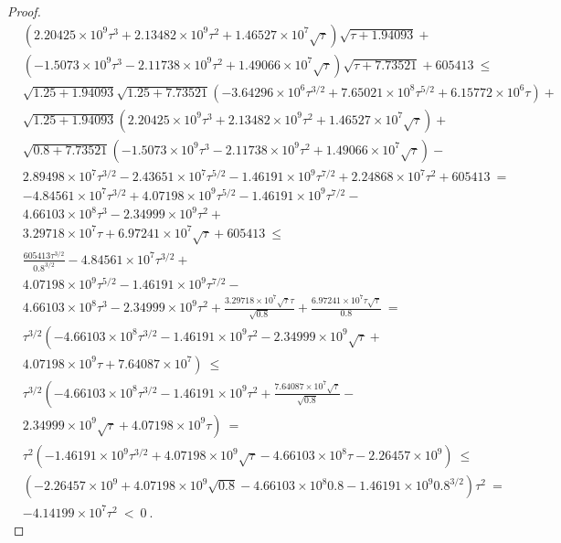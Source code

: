 \documentclass{article}
\renewcommand{\leq}{\leqslant}
\begin{document}
\begin{proof}
\begin{align}
&\left(2.20425\times 10^9 \tau^3+2.13482\times 10^9 \tau^2+1.46527\times 10^7 \sqrt{\tau}\right) \sqrt{\tau+1.94093}+\\ \nonumber 
&\left(-1.5073\times 10^9 \tau^3-2.11738\times 10^9 \tau^2+1.49066\times 10^7 \sqrt{\tau}\right) \sqrt{\tau+7.73521}+605413 \ \leq \\ \nonumber
&\sqrt{1.25 +1.94093} \sqrt{1.25 +7.73521} \left(-3.64296\times 10^6 \tau^{3/2}+7.65021\times 10^8 \tau^{5/2}+6.15772\times 10^6 \tau\right)+\\ \nonumber 
&\sqrt{1.25 +1.94093} \left(2.20425\times 10^9 \tau^3+2.13482\times 10^9 \tau^2+1.46527\times 10^7 \sqrt{\tau}\right)+\\ \nonumber 
&\sqrt{0.8 +7.73521} \left(-1.5073\times 10^9 \tau^3-2.11738\times 10^9 \tau^2+1.49066\times 10^7 \sqrt{\tau}\right)-\\ \nonumber 
&2.89498\times 10^7 \tau^{3/2}-2.43651\times 10^7 \tau^{5/2}-1.46191\times 10^9 \tau^{7/2}+2.24868\times 10^7 \tau^2+605413 \ = \\ \nonumber 
&-4.84561\times 10^7 \tau^{3/2}+4.07198\times 10^9 \tau^{5/2}-1.46191\times 10^9 \tau^{7/2}-\\ \nonumber 
&4.66103\times 10^8 \tau^3-2.34999\times 10^9 \tau^2+\\ \nonumber 
&3.29718\times 10^7 \tau+6.97241\times 10^7 \sqrt{\tau}+605413\ \leq \\ \nonumber 
& \frac{605413 \tau^{3/2}}{0.8^{3/2}}-4.84561\times 10^7 \tau^{3/2}+\\ \nonumber 
&4.07198\times 10^9 \tau^{5/2}-1.46191\times 10^9 \tau^{7/2}-\\ \nonumber 
&4.66103\times 10^8 \tau^3-2.34999\times 10^9 \tau^2+\frac{3.29718\times 10^7 \sqrt{\tau} \tau}{\sqrt{0.8}}+\frac{6.97241\times 10^7 \tau \sqrt{\tau}}{0.8}\ = \\ \nonumber 
&\tau^{3/2} \left(-4.66103\times 10^8 \tau^{3/2}-1.46191\times 10^9 \tau^2-2.34999\times 10^9 \sqrt{\tau}+\right.\\ \nonumber 
&\left.4.07198\times 10^9 \tau+7.64087\times 10^7\right)\ \leq \\ \nonumber 
& \tau^{3/2} \left(-4.66103\times 10^8 \tau^{3/2}-1.46191\times 10^9 \tau^2+\frac{7.64087\times 10^7 \sqrt{\tau}}{\sqrt{0.8}}-\right.\\ \nonumber 
&\left.2.34999\times 10^9 \sqrt{\tau}+4.07198\times 10^9 \tau\right)\ = \\ \nonumber 
&\tau^2 \left(-1.46191\times 10^9 \tau^{3/2}+4.07198\times 10^9 \sqrt{\tau}-4.66103\times 10^8 \tau-2.26457\times 10^9\right)\ \leq \\ \nonumber 
&  \left(-2.26457\times 10^9+4.07198\times 10^9 \sqrt{0.8}-4.66103\times 10^8 0.8-1.46191\times 10^9 0.8^{3/2}\right) \tau^2\ = \\ \nonumber 
&-4.14199\times 10^7 \tau^2\ < \ 0 \ . 
\end{align}


\end{proof}
\end{document}
